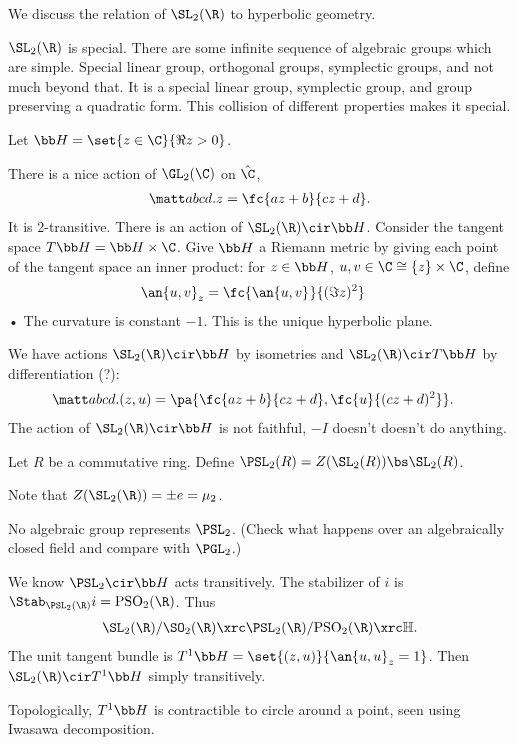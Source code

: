 We discuss the relation of $\SL_2(\R)$ to hyperbolic geometry. 

$\SL_2(\R)$ is special.
There are some infinite sequence of algebraic groups which are simple. Special linear group, orthogonal groups, symplectic groups, and not much beyond that.
It is a special linear group, symplectic group, and group preserving a quadratic form. This collision of different properties makes it special.

Let $\bb H = \set{z\in \C}{\Re z>0}$. 

There is a nice action of $\GL_2(\C)$ on $\hat \C$,
\begin{align}
\matt abcd . z = \fc{az+b}{cz+d}.
\end{align}
It is 2-transitive. There is an action of $\SL_2(\R)\cir \bb H$.
Consider the tangent space $T\bb H = \bb H \times \C$. Give $\bb H$ a Riemann metric by giving each point of the tangent space an inner product: for $z\in \bb H$, $u,v\in \C\cong \{z\}\times \C$, define
\begin{align}
\an{u,v}_{z} & =\fc{\an{u,v}_{}}{(\Im z)^2}
\end{align}•
The curvature is constant $-1$. This is the unique hyperbolic plane.

We have actions $\SL_2(\R)\cir \bb H$ by isometries and $\SL_2(\R) \cir T\bb H$ by differentiation (?):
\begin{align}
\matt abcd . (z,u) &= \pa{\fc{az+b}{cz+d}, \fc{u}{(cz+d)^2}}.
\end{align}
The action of $\SL_2(\R)\cir \bb H$ is not faithful, $-I$ doesn't doesn't do anything.
\begin{df}
Let $R$ be a commutative ring. Define $\PSL_2(R) = Z(\SL_2(R))\bs \SL_2(R)$. 
\end{df}
Note that $Z(\SL_2(\R)) = \pm e = \mu_2$.
\begin{exr}
No algebraic group represents $\PSL_2$. (Check what happens over an algebraically closed field and compare with $\PGL_2$.) 
\end{exr}
We know $\PSL_2\cir \bb H$ acts transitively. The stabilizer of $i$ is $\Stab_{\PSL_2(\R)} i = \mathrm{PSO}_2(\R)$. Thus
\begin{align}
\SL_2(\R)/\SO_2(\R) 
\xrc 
\PSL_2(\R)/\mathrm{PSO}_2(\R)
\xrc
\mathbb H.
\end{align}
The unit tangent bundle is $T^1\bb H = \set{(z,u)}{\an{u,u}_z=1}$. Then $\SL_2(\R)\cir T^1\bb H$ simply transitively.

Topologically, $T^1\bb H$ is contractible to circle around a point, seen using Iwasawa decomposition.

